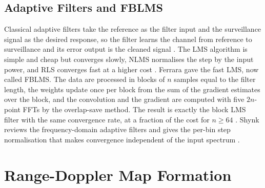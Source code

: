 \subsection{Adaptive Filters and FBLMS}
\label{subsec:th.dsi.adaptive}
\todo{}
Classical adaptive filters take the reference as the filter input and the surveillance signal as the desired response, so the filter learns the channel from reference to surveillance and its error output is the cleaned signal \citep{malanowski2006}. The LMS algorithm is simple and cheap but converges slowly, NLMS normalises the step by the input power, and RLS converges fast at a higher cost \citep{cardinali2007,malanowski2006}. Ferrara \citep{ferrara1980} gave the fast LMS, now called FBLMS. The data are processed in blocks of $n$ samples equal to the filter length, the weights update once per block from the sum of the gradient estimates over the block, and the convolution and the gradient are computed with five $2n$-point FFTs by the overlap-save method. The result is exactly the block LMS filter with the same convergence rate, at a fraction of the cost for $n \geq 64$ \citep{ferrara1980}. Shynk \citep{shynk1992} reviews the frequency-domain adaptive filters and gives the per-bin step normalisation that makes convergence independent of the input spectrum .

\section{Range-Doppler Map Formation}
\label{sec:th.ard}
\todo{}

